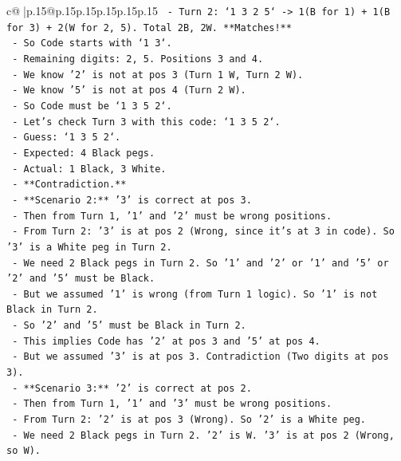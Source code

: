 \documentclass{article}
\begin{document}
{\begin{supertabular}{c@{$\;$}|p{.15\linewidth}@{}p{.15\linewidth}p{.15\linewidth}p{.15\linewidth}p{.15\linewidth}p{.15\linewidth}}
{{{\texttt{            {-} Turn 2: `1 3 2 5` {-}> 1(B for 1) + 1(B for 3) + 2(W for 2, 5). Total 2B, 2W. **Matches!**} \\
\texttt{            {-} So Code starts with `1 3`.} \\
\texttt{            {-} Remaining digits: 2, 5. Positions 3 and 4.} \\
\texttt{            {-} We know '2' is not at pos 3 (Turn 1 W, Turn 2 W).} \\
\texttt{            {-} We know '5' is not at pos 4 (Turn 2 W).} \\
\texttt{            {-} So Code must be `1 3 5 2`.} \\
\texttt{            {-} Let's check Turn 3 with this code: `1 3 5 2`.} \\
\texttt{              {-} Guess: `1 3 5 2`.} \\
\texttt{              {-} Expected: 4 Black pegs.} \\
\texttt{              {-} Actual: 1 Black, 3 White.} \\
\texttt{              {-} **Contradiction.**} \\
\texttt{        {-} **Scenario 2:** '3' is correct at pos 3.} \\
\texttt{          {-} Then from Turn 1, '1' and '2' must be wrong positions.} \\
\texttt{          {-} From Turn 2: '3' is at pos 2 (Wrong, since it's at 3 in code). So '3' is a White peg in Turn 2.} \\
\texttt{          {-} We need 2 Black pegs in Turn 2. So '1' and '2' or '1' and '5' or '2' and '5' must be Black.} \\
\texttt{          {-} But we assumed '1' is wrong (from Turn 1 logic). So '1' is not Black in Turn 2.} \\
\texttt{          {-} So '2' and '5' must be Black in Turn 2.} \\
\texttt{          {-} This implies Code has '2' at pos 3 and '5' at pos 4.} \\
\texttt{          {-} But we assumed '3' is at pos 3. Contradiction (Two digits at pos 3).} \\
\texttt{        {-} **Scenario 3:** '2' is correct at pos 2.} \\
\texttt{          {-} Then from Turn 1, '1' and '3' must be wrong positions.} \\
\texttt{          {-} From Turn 2: '2' is at pos 3 (Wrong). So '2' is a White peg.} \\
\texttt{          {-} We need 2 Black pegs in Turn 2. '2' is W. '3' is at pos 2 (Wrong, so W).} \\
}}}
\end{supertabular}}
\end{document}
